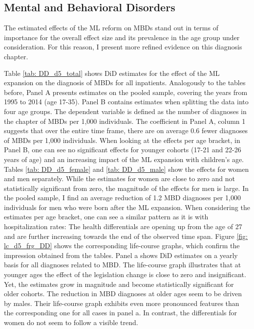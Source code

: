 \documentclass[11pt, a4paper, draft]{article} %
\begin{document}
\bigskip
\subsection{Mental and Behavioral Disorders}
The estimated effects of the ML reform on MBDs stand out in terms of importance for the overall effect size and its prevalence in the age group under consideration. For this reason, I present more refined evidence on this diagnosis chapter. %

Table \ref{tab: DD_d5_total} shows DiD estimates for the effect of the ML expansion on the diagnosis of MBDs for all inpatients. Analogously to the tables before, Panel A presents estimates on the pooled sample, covering the years from 1995 to 2014 (age 17-35). Panel B contains estimates when splitting the data into four age groups. The dependent variable is defined as the number of diagnoses in the chapter of MBDs per 1,000 individuals. The coefficient in Panel A, column 1 suggests that over the entire time frame, there are on average 0.6 fewer diagnoses of MBDs per 1,000 individuals. When looking at the effects per age bracket, in Panel B, one can see no significant effects for younger cohorts (17-21 and 22-26 years of age) and an increasing impact of the ML expansion with children's age. Tables \ref{tab: DD_d5_female} and \ref{tab: DD_d5_male} show the effects for women and men separately. While the estimates for women are close to zero and not statistically significant from zero, the magnitude of the effects for men is large. In the pooled sample, I find an average reduction of 1.2 MBD diagnoses per 1,000 individuals for men who were born after the ML expansion. When considering the estimates per age bracket, one can see a similar pattern as it is with hospitalization rates: The health differentials are opening up from the age of 27 and are further increasing towards the end of the observed time span. Figure \ref{fig: lc_d5_frg_DD} shows the corresponding life-course graphs, which confirm the impression obtained from the tables. Panel a shows DiD estimates on a yearly basis for all diagnoses related to MBD. The life-course graph illustrates that at younger ages the effect of the legislation change is close to zero and insignificant. Yet, the estimates grow in magnitude and become statistically significant for older cohorts. The reduction in MBD diagnoses at older ages seem to be driven by males. Their life-course graph exhibits even more pronounced features than the corresponding one for all cases in panel a. In contrast, the differentials for women do not seem to follow a visible trend. 
\end{document}
